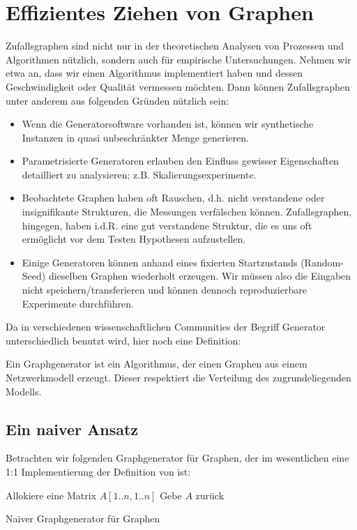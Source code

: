 \section{Effizientes Ziehen von \Gnp Graphen}
Zufallsgraphen sind nicht nur in der theoretischen Analysen von Prozessen und Algorithmen nützlich, sondern auch für empirische Untersuchungen.
Nehmen wir etwa an, dass wir einen Algorithmus implementiert haben und dessen Geschwindigkeit oder Qualität vermessen möchten.
Dann können Zufallsgraphen unter anderem aus folgenden Gründen nützlich sein:
\begin{itemize}
    \item Wenn die Generatorsoftware vorhanden ist, können wir synthetische Instanzen in quasi unbeschränkter Menge generieren.
    \item Parametrisierte Generatoren erlauben den Einfluss gewisser Eigenschaften detailliert zu analysieren; z.B. Skalierungsexperimente.
    \item Beobachtete Graphen haben oft \glqq Rauschen\grqq, d.h. nicht verstandene oder insignifikante Strukturen, die Messungen verfälschen können.
          Zufallsgraphen, hingegen, haben i.d.R. eine gut verstandene Struktur, die es uns oft ermöglicht vor dem Testen Hypothesen aufzustellen.
    \item Einige Generatoren können anhand eines fixierten Startzustands (Random-Seed) dieselben Graphen wiederholt erzeugen.
          Wir müssen also die Eingaben nicht speichern/transferieren und können dennoch reproduzierbare Experimente durchführen.
\end{itemize}

\noindent Da in verschiedenen wissenschaftlichen Communities der Begriff \glqq Generator\grqq{} unterschiedlich benutzt wird, hier noch eine Definition:
\begin{definition}
    Ein  Graphgenerator ist ein Algorithmus, der einen Graphen aus einem Netzwerkmodell erzeugt.
    Dieser respektiert die Verteilung des zugrundeliegenden Modells.
\end{definition}

\subsection{Ein naiver Ansatz}
Betrachten wir folgenden Graphgenerator für \Gnp Graphen, der im wesentlichen eine 1:1 Implementierung der Definition von \Gnp ist:

\begin{algorithm}[H]
    Allokiere eine Matrix $A[1..n, 1..n]$\;
    Gebe $A$ zurück
    \caption{Naiver Graphgenerator für \Gnp Graphen}
    \label{alg:naive-gnp}
\end{algorithm}

